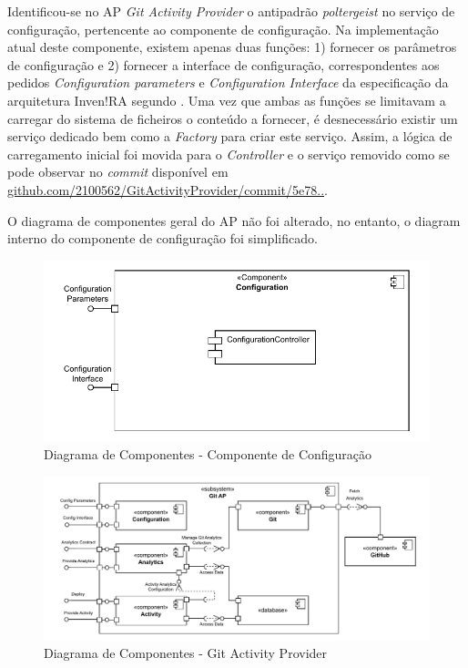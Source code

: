 \documentclass[12pt,a4paper,final]{article}
\begin{document}
    \noindent Identificou-se no AP \textit{Git Activity Provider} o antipadrão \textit{poltergeist} no serviço de configuração, pertencente ao componente de configuração.
    Na implementação atual deste componente, existem apenas duas funções: 1) fornecer os parâmetros de configuração e 2) fornecer a interface de configuração, correspondentes aos pedidos \textit{Configuration parameters} e \textit{Configuration Interface} da especificação da arquitetura Inven!RA segundo \cite{su15010857}.
    Uma vez que ambas as funções se limitavam a carregar do sistema de ficheiros o conteúdo a fornecer, é desnecessário existir um serviço dedicado bem como a \textit{Factory} para criar este serviço.
    Assim, a lógica de carregamento inicial foi movida para o \textit{Controller} e o serviço removido como se pode observar no \textit{commit} disponível em \href{https://github.com/2100562/GitActivityProvider/commit/5e78cf48587040aa2c1760b5d20ad858bd60c52e}{github.com/2100562/GitActivityProvider/commit/5e78..}.

    O diagrama de componentes geral do AP não foi alterado, no entanto, o diagram interno do componente de configuração foi simplificado.

    \begin{figure}[H]
        \centering
        \includegraphics[width=\textwidth]{diagrama_componentes_v2-Configuration.drawio}
        \caption{Diagrama de Componentes - Componente de Configuração}
        \label{fig:dccc}
    \end{figure}

    \begin{figure}[H]
        \centering
        \includegraphics[width=\textwidth]{diagrama_componentes_v2-AP.drawio}
        \caption{Diagrama de Componentes - Git Activity Provider}
        \label{fig:dcgap}
    \end{figure}
\end{document}
